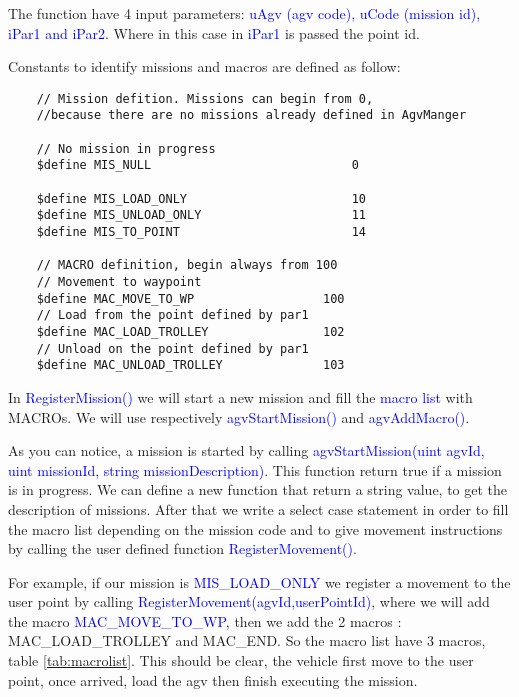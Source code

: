 The function have 4 input parameters: \textcolor{blue}{uAgv (agv code), uCode (mission id), iPar1 and iPar2}. Where in this case in \textcolor{blue}{iPar1} is passed the point id.

Constants to identify missions and macros are defined as follow:\\

\begin{lstlisting}
	// Mission defition. Missions can begin from 0, 
	//because there are no missions already defined in AgvManger
	
	// No mission in progress
	$define MIS_NULL							0
	
	$define MIS_LOAD_ONLY						10
	$define MIS_UNLOAD_ONLY						11
	$define MIS_TO_POINT						14
	
	// MACRO definition, begin always from 100
	// Movement to waypoint
	$define MAC_MOVE_TO_WP					100
	// Load from the point defined by par1
	$define MAC_LOAD_TROLLEY				102
	// Unload on the point defined by par1
	$define MAC_UNLOAD_TROLLEY				103
\end{lstlisting}

In \textcolor{blue}{RegisterMission()} we will start a new mission and fill the \textcolor{blue}{macro list} with MACROs. We will use respectively \textcolor{blue}{agvStartMission()} and \textcolor{blue}{agvAddMacro()}.

As you can notice, a mission is started by calling \textcolor{blue}{agvStartMission(uint agvId, uint missionId, string missionDescription)}. This function return true if a mission is in progress. We can define a new function that return a string value, to get the description of missions.
After that we write a select case statement in order to fill the macro list depending on the mission code and to give movement instructions by calling the user defined function \textcolor{blue}{RegisterMovement()}.

For example, if our mission is \textcolor{blue}{MIS\_LOAD\_ONLY}  we register a movement to the user point by calling \textcolor{blue}{RegisterMovement(agvId,userPointId)}, where we will add the macro \textcolor{blue}{MAC\_MOVE\_TO\_WP}, then we add the 2 macros : MAC\_LOAD\_TROLLEY and MAC\_END. So the macro list have 3 macros, table \ref{tab:macrolist}. This should be clear, the vehicle first move to the user point, once arrived, load the agv then finish executing the mission.

